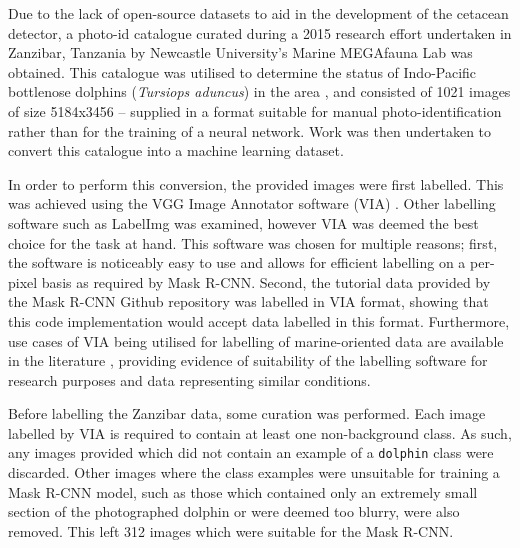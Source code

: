 Due to the lack of open-source datasets to aid in the development of the cetacean detector, a photo-id catalogue curated during a 2015 research effort undertaken in Zanzibar, Tanzania by Newcastle University's Marine MEGAfauna Lab was obtained. This catalogue was utilised to determine the status of Indo-Pacific bottlenose dolphins (\textit{Tursiops aduncus}) in the area \cite{sharpe_indian_2019}, and consisted of 1021 images of size 5184x3456 -- supplied in a format suitable for manual photo-identification rather than for the training of a neural network. Work was then undertaken to convert this catalogue into a machine learning dataset. 

In order to perform this conversion, the provided images were first labelled. This was achieved using the VGG Image Annotator software (VIA) \cite{dutta_via_2019}. Other labelling software such as LabelImg \cite{tzutalin_labelimg_2021} was examined, however VIA was deemed the best choice for the task at hand. This software was chosen for multiple reasons; first, the software is noticeably easy to use and allows for efficient labelling on a per-pixel basis as required by Mask R-CNN. Second, the tutorial data provided by the Mask R-CNN Github repository was labelled in VIA format, showing that this code implementation would accept data labelled in this format. Furthermore, use cases of VIA being utilised for labelling of marine-oriented data are available in the literature \cite{nita_cnn-based_2020}, providing evidence of suitability of the labelling software for research purposes and data representing similar conditions.

Before labelling the Zanzibar data, some curation was performed. Each image labelled by VIA is required to contain at least one non-background class. As such, any images provided which did not contain an example of a \texttt{dolphin} class were discarded. Other images where the class examples were unsuitable for training a Mask R-CNN model, such as those which contained only an extremely small section of the photographed dolphin or were deemed too blurry, were also removed. This left 312 images which were suitable for the Mask R-CNN.

